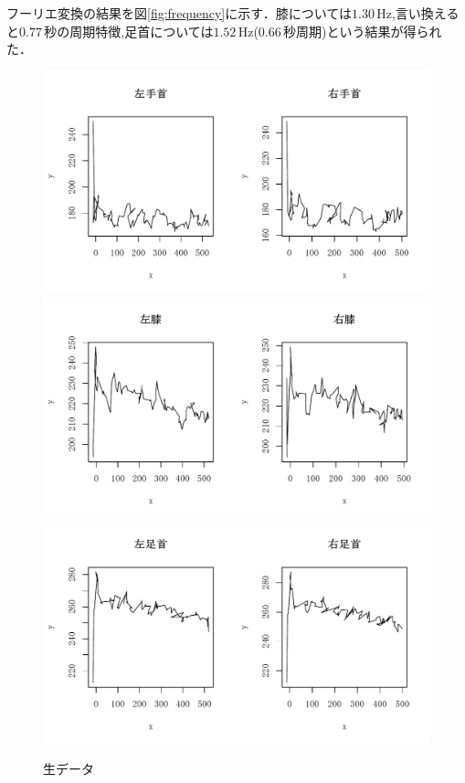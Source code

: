 \documentclass[a4j,10.5pt]{jreport}
\begin{document}
フーリエ変換の結果を図\ref{fig:frequency}に示す．膝については$1.30\,\mathrm{Hz} $,言い換えると$0.77\,\mathrm{秒}$の周期特徴,足首については$1.52\,\mathrm{Hz}$($0.66\,\mathrm{秒}$周期)という結果が得られた．

\begin{figure}
    \centering
    \caption{生データ}
    \includegraphics[width=0.9\linewidth]{figs/original_wrist.pdf}
    \includegraphics[width=0.9\linewidth]{figs/original_knee.pdf}
    \includegraphics[width=0.9\linewidth]{figs/original_ankle.pdf}
    \label{fig:originaldata}
\end{figure}
\end{document}
